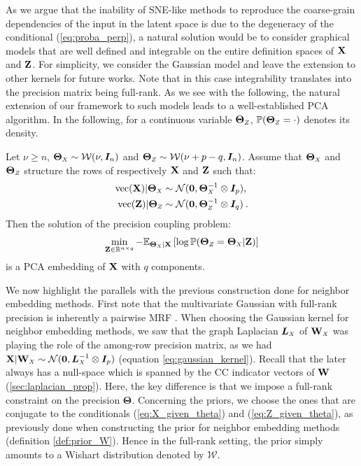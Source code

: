 As we argue that the inability of SNE-like methods to reproduce the coarse-grain dependencies of the input in the latent space is due to the degeneracy of the conditional (\ref{eq:proba_perp}), a natural solution would be to consider graphical models that are well defined and integrable on the entire definition spaces of $\mathbf{X}$ and $\mathbf{Z}$. For simplicity, we consider the Gaussian model and leave the extension to other kernels for future works. Note that in this case integrability translates into the precision matrix being full-rank. As we see with the following, the natural extension of our framework to such models leads to a well-established PCA algorithm. In the following, for a continuous variable $\bm{\Theta}_{\scaleto{Z}{4pt}}$, $\mathbb{P}(\bm{\Theta}_{\scaleto{Z}{4pt}} = \cdot)$ denotes its density.
\begin{theorem}\label{PCA_graph_coupling}
Let $\nu \geq n$,  $\bm{\Theta}_{\scaleto{X}{4pt}} \sim \mathcal{W}(\nu, \bm{I}_n)$ and $\bm{\Theta}_{\scaleto{Z}{4pt}} \sim \mathcal{W}(\nu + p - q, \bm{I}_n)$. Assume that $\bm{\Theta}_{\scaleto{X}{4pt}}$ and $\bm{\Theta}_{\scaleto{Z}{4pt}}$ structure the rows of respectively $\mathbf{X}$ and $\mathbf{Z}$ such that: 
\begin{align}
    \mathrm{vec}(\Xb) | \bm{\Theta}_{\scaleto{X}{4pt}} &\sim \mathcal{N}(\bm{0}, \bm{\Theta}_{\scaleto{X}{4pt}}^{-1} \otimes \bm{I}_p), \label{eq:X_given_theta} \\
    \mathrm{vec}(\Zb) | \bm{\Theta}_{\scaleto{Z}{4pt}} &\sim \mathcal{N}(\bm{0}, \bm{\Theta}_{\scaleto{Z}{4pt}}^{-1} \otimes \bm{I}_q) \label{eq:Z_given_theta} \:.
\end{align}
Then the solution of the precision coupling problem:
\begin{align*}
    \min_{\Zb \in \mathbb{R}^{n \times q}} -\mathbb{E}_{\bm{\Theta}_{\scaleto{X}{3pt}} | \Xb}\left[\log \mathbb{P}(\bm{\Theta}_{\scaleto{Z}{4pt}}=\bm{\Theta}_{\scaleto{X}{4pt}}|\Zb)\right]
\end{align*}
is a PCA embedding of $\mathbf{X}$ with $q$ components.
\end{theorem}
We now highlight the parallels with the previous construction done for neighbor embedding methods. First note that the multivariate Gaussian with full-rank precision is inherently a pairwise MRF \cite{rue2005gaussian}. When choosing the Gaussian kernel for neighbor embedding methods, we saw that the graph Laplacian $\bm{L}_{\scaleto{X}{4pt}}$ of $\Wb_{\scaleto{X}{4pt}}$ was playing the role of the among-row precision matrix, as we had $\Xb | \Wb_{\scaleto{X}{4pt}} \sim \mathcal{N}(\bm{0}, \bm{L}_{\scaleto{X}{4pt}}^{-1} \otimes \bm{I}_p)$ (equation \ref{eq:gaussian_kernel}). Recall that the later always has a null-space which is spanned by the CC indicator vectors of $\mathbf{W}$ (\cref{sec:laplacian_prop}). Here, the key difference is that we impose a full-rank constraint on the precision $\bm{\Theta}$. Concerning the priors, we choose the ones that are conjugate to the conditionals (\ref{eq:X_given_theta}) and (\ref{eq:Z_given_theta}), as previously done when constructing the prior for neighbor embedding methods (definition \ref{def:prior_W}). Hence in the full-rank setting, the prior simply amounts to a Wishart distribution denoted by $\mathcal{W}$.

